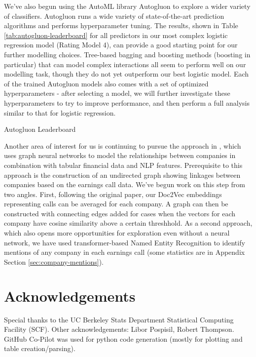 \documentclass{article}[11pt]
\begin{document}
    We've also begun using the AutoML library Autogluon to explore a wider variety of classifiers. Autogluon runs a wide variety of state-of-the-art prediction algorithms and performs hyperparameter tuning. The results, shown in Table \ref{tab:autogluon-leaderboard} for all predictors in our most complex logistic regression model (Rating Model 4), can provide a good starting point for our further modelling choices. Tree-based bagging and boosting methods (boosting in particular) that can model complex interactions all seem to perform well on our modelling task, though they do not yet outperform our best logistic model. Each of the trained Autogluon models also comes with a set of optimized hyperparameters - after selecting a model, we will further investigate these hyperparameters to try to improve performance, and then perform a full analysis similar to that for logistic regression.

    \begin{table}[h!]
        \centering
        \caption{Autogluon Leaderboard}
        
        \label{tab:autogluon-leaderboard}
    \end{table}

    Another area of interest for us is continuing to pursue the approach in \cite{das_credit_2023}, which uses graph neural networks to model the relationships between companies in combination with tabular financial data and NLP features. Prerequisite to this approach is the construction of an undirected graph showing linkages between companies based on the earnings call data. We've begun work on this step from two angles. First, following the original paper, our Doc2Vec embeddings representing calls can be averaged for each company. A graph can then be constructed with connecting edges added for cases when the vectors for each company have cosine similarity above a certain threshhold. As a second approach, which also opens more opportunities for exploration even without a neural network, we have used transformer-based Named Entity Recognition to identify mentions of any company in each earnings call (some statistics are in Appendix Section \ref{sec:company-mentions}).
    
    \section*{Acknowledgements}

    Special thanks to the UC Berkeley Stats Department Statistical Computing Facility (SCF). Other acknowledgements: Libor Pospisil, Robert Thompson. GitHub Co-Pilot was used for python code generation (mostly for plotting and table creation/parsing).
\end{document}
